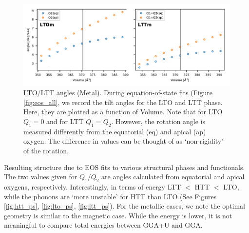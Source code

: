 \begin{figure}
    \centering
    \includegraphics[width=\textwidth]{fig/simulation/angles_metal_lto_ltt.pdf}
    \caption[Metal: LTO/LTT angles during EOS fits]{LTO/LTT angles (Metal). During equation-of-state fits (Figure \ref{fig:eos_all}, we record the tilt angles for the LTO and LTT phase. Here, they are plotted as a function of Volume. Note that for LTO $Q_1=0$ and for LTT $Q_1=Q_2$. However, the rotation angle is measured differently from the equatorial (eq) and apical (ap) oxygen. The difference in values can be thought of as `non-rigidity' of the rotation.}
    \label{fig:my_label}
\end{figure}

\begin{table}[b]
    \centering
    
    \caption[Simulation Structure Results]{Resulting structure due to EOS fits to various structural phases and functionals. The two values given for $Q_1$/$Q_2$ are angles calculated from equatorial and apical oxygens, respectively. Interestingly, in terms of energy LTT $<$ HTT $<$ LTO, while the phonons are `more unstable' for HTT than LTO (See Figures \ref{fig:htt_ps}, \ref{fig:lto_ps}, \ref{fig:ltt_ps}). For the metallic cases, we note the optimal geometry is similar to the magnetic case. While the energy is lower, it is not meaningful to compare total energies between GGA+U and GGA.}
    \label{tab:sim_struct}
\end{table}

